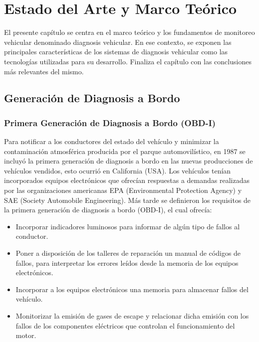 \chapter[Capítulo 2. Marco Teórico y Fundamentos]{Estado del Arte y Marco Teórico}

El presente capítulo se centra en el  marco teórico y los fundamentos de  monitoreo vehicular denominado diagnosis vehicular. En ese contexto, se exponen las principales características de los sistemas de diagnosis vehicular como las tecnologías utilizadas para su desarrollo. Finaliza el capítulo con las conclusiones más relevantes del mismo.


\section{Generación de Diagnosis a Bordo}

\subsection{Primera Generación de Diagnosis a Bordo (OBD-I)}

Para notificar a los conductores del estado del vehículo y minimizar la contaminación atmosférica producida por el parque automovilístico, en 1987 se incluyó la primera generación de diagnosis a bordo en las nuevas producciones de vehículos vendidos, esto ocurrió en California (USA). Los vehículos tenían incorporados equipos electrónicos que ofrecían respuestas a demandas realizadas por las organizaciones americanas EPA (Environmental Protection Agency) y SAE (Society Automobile Engineering). 
Más tarde se definieron los requisitos de la primera generación de diagnosis a bordo (OBD-I), el cual ofrecía:

\begin{itemize}
\item Incorporar indicadores luminosos para informar de algún tipo de fallos al conductor.
\item Poner a disposición de los talleres de reparación un manual de códigos de fallos, para interpretar los errores leídos desde la memoria de los equipos electrónicos.
\item Incorporar a los equipos electrónicos una memoria para almacenar fallos del vehículo. 
\item Monitorizar la emisión de gases de escape y relacionar dicha emisión con los fallos de los componentes eléctricos que controlan el funcionamiento del motor.
\end{itemize}

